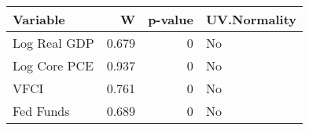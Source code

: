 \begingroup
\fontsize{12.0pt}{14.4pt}\selectfont
\begin{tabular}{lrrl}
\toprule
Variable & W & p-value & UV.Normality \\ 
\midrule\addlinespace[2.5pt]
Log Real GDP & 0.679 & 0 & No \\ 
Log Core PCE & 0.937 & 0 & No \\ 
VFCI & 0.761 & 0 & No \\ 
Fed Funds & 0.689 & 0 & No \\ 
\bottomrule
\end{tabular}
\endgroup

